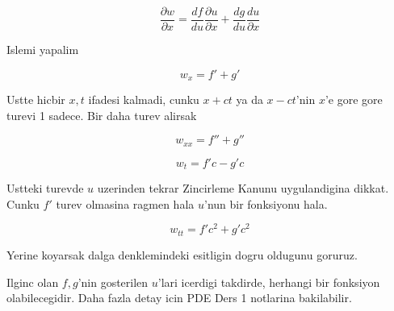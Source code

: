 \documentclass[12pt,fleqn]{article}
\begin{document}
\[ \frac{\partial w}{\partial x}  = 
\frac{df}{du}
\frac{\partial u}{\partial x} + 
\frac{dg}{du}
\frac{du}{\partial x} 
\]

Islemi yapalim

\[ w_x = f' + g' \]

Ustte hicbir $x,t$ ifadesi kalmadi, cunku $x+ct$ ya da $x-ct$'nin $x$'e
gore gore turevi 1 sadece. Bir daha turev alirsak

\[ w_{xx} = f'' + g'' \]

\[ w_t = f'c - g'c \]

Ustteki turevde $u$ uzerinden tekrar Zincirleme Kanunu uygulandigina
dikkat. Cunku $f'$ turev olmasina ragmen hala $u$'nun bir fonksiyonu hala.

\[ w_{tt} = f'c^2 + g'c^2 \]

Yerine koyarsak dalga denklemindeki esitligin dogru oldugunu goruruz. 

Ilginc olan $f,g$'nin gosterilen $u$'lari icerdigi takdirde, herhangi bir
fonksiyon olabilecegidir. Daha fazla detay icin PDE Ders 1 notlarina
bakilabilir.
\end{document}
